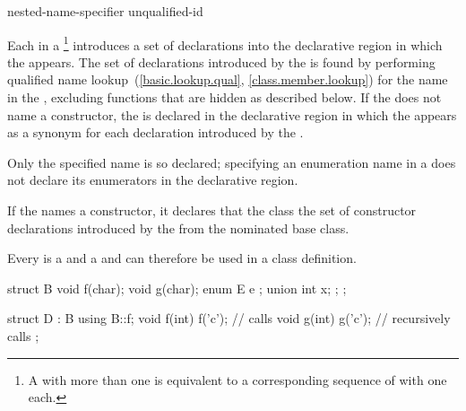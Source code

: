 \begin{bnf}
\br
     nested-name-specifier unqualified-id
\end{bnf}

\pnum
Each  in a %
\footnote{A  with more than one
 is equivalent to a corresponding sequence
of  with
one  each.}
introduces a set of declarations into the declarative region in
which the  appears.
The set of declarations introduced by the  is found by
performing qualified name lookup~(\ref{basic.lookup.qual}, \ref{class.member.lookup})
for the name in the ,
excluding functions that are hidden as described below.
If the  does not name a constructor,
the  is declared in the declarative region
in which the  appears
as a synonym for each declaration introduced by the .
\begin{note}
Only the specified name is so declared;
specifying an enumeration name in a 
does not declare its enumerators
in the  declarative region.
\end{note}
%
If the  names a constructor,
it declares that the class  the set of constructor declarations
introduced by the  from the nominated base class.

\pnum
Every  is a  and a
 and can therefore be used in a class definition.
\begin{example}
\begin{codeblock}
struct B {
  void f(char);
  void g(char);
  enum E { e };
  union { int x; };
};

struct D : B {
  using B::f;
  void f(int) { f('c'); }       // calls 
  void g(int) { g('c'); }       // recursively calls 
};
\end{codeblock}
\end{example}

